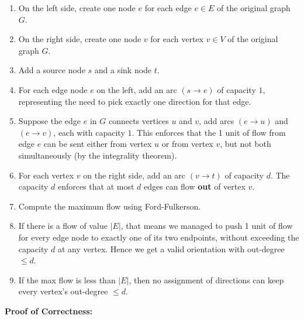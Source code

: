 \documentclass[11pt]{article}
\begin{document}
\begin{description}
\begin{enumerate}
  \item On the left side, create one node \(e\) for each edge \(e \in E\) of the original graph \(G\).  
  \item On the right side, create one node \(v\) for each vertex \(v \in V\) of the original graph \(G\).
  \item Add a source node \(s\) and a sink node \(t\).
  \item For each edge node \(e\) on the left, add an arc \((s \to e)\) of capacity \(1\), representing the need to pick exactly one direction for that edge. 
  \item Suppose the edge \(e\) in \(G\) connects vertices \(u\) and \(v\), add arcs \((e \to u)\) and \((e \to v)\), each with capacity \(1\). 
  This enforces that the 1 unit of flow from edge \(e\) can be sent either from vertex \(u\) or from vertex \(v\), 
  but not both simultaneously (by the integrality theorem).
  \item For each vertex \(v\) on the right side, add an arc \((v \to t)\) of capacity \(d\). 
  The capacity \(d\) enforces that at most \(d\) edges can flow \textbf{out} of vertex \(v\).
  \item Compute the maximum flow using Ford-Fulkerson. 
  \item If there is a flow of value \(\lvert E\rvert\), that means we managed to push 1 unit of flow for every edge node to exactly one of its two endpoints, without exceeding the capacity \(d\) at any vertex.  Hence we get a valid orientation with out-degree \(\le d\).  
  \item If the max flow is less than \(\lvert E\rvert\), then no assignment of directions can keep every vertex's out-degree \(\le d\).  
\end{enumerate}

\textbf{Proof of Correctness:}


\end{description}
\end{document}
